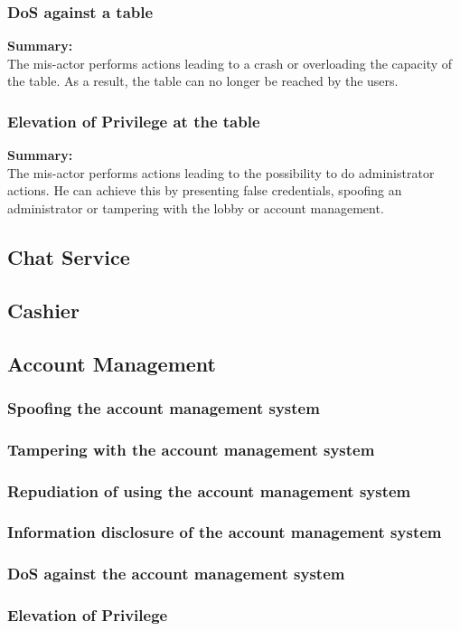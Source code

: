 \documentclass[a4paper,11pt]{report}
\begin{document}
\subsubsection{DoS against a table}
\textbf{Summary:} \\
The mis-actor performs actions leading to a crash or overloading the capacity of the table. As a result, the table can no longer be reached by the users.
\subsubsection{Elevation of Privilege at the table}
\textbf{Summary:} \\
The mis-actor performs actions leading to the possibility to do administrator actions. He can achieve this by presenting false credentials, spoofing an administrator or tampering with the lobby or account management.
\subsection{Chat Service}
\subsection{Cashier}
\subsection{Account Management}
\subsubsection{Spoofing the account management system}
\subsubsection{Tampering with the account management system}
\subsubsection{Repudiation of using the account management system}
\subsubsection{Information disclosure of the account management system}
\subsubsection{DoS against the account management system}
\subsubsection{Elevation of Privilege}
\end{document}
